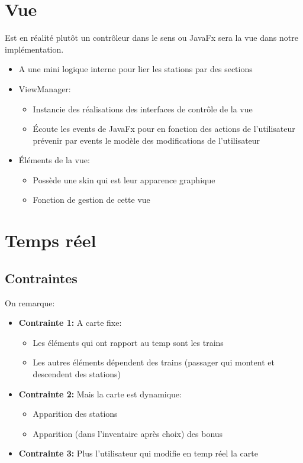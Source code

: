 \documentclass[report, backcover, french, nodocumentinfo]{upmethodology-document}
\begin{document}
		\section{Vue}
			Est en réalité plutôt un contrôleur dans le sens ou JavaFx sera la vue dans notre implémentation.
			\begin{itemize}
				\item A une mini logique interne pour lier les stations par des sections
				\item ViewManager:
					\begin{itemize}
						\item Instancie des réalisations des interfaces de contrôle de la vue
						\item Écoute les events de JavaFx pour en fonction des actions de l'utilisateur prévenir par events le modèle des modifications de l'utilisateur
					\end{itemize}
				\item Éléments de la vue:
					\begin{itemize}
						\item Possède une skin qui est leur apparence graphique
						\item Fonction de gestion de cette vue
					\end{itemize}
			\end{itemize}
		\section{Temps réel}
			\subsection{Contraintes}
			On remarque:
			\begin{itemize}
				\item \textbf{Contrainte 1:} A carte fixe:
					\begin{itemize}
						\item Les éléments qui ont rapport au temp sont les trains
						\item Les autres éléments dépendent des trains (passager qui montent et descendent des stations)
					\end{itemize}
				\item \textbf{Contrainte 2:} Mais la carte est dynamique:
					\begin{itemize}
						\item Apparition des stations
						\item Apparition (dans l'inventaire après choix) des bonus
					\end{itemize}
				\item \textbf{Contrainte 3:} Plus l'utilisateur qui modifie en temp réel la carte
			\end{itemize}
\end{document}
